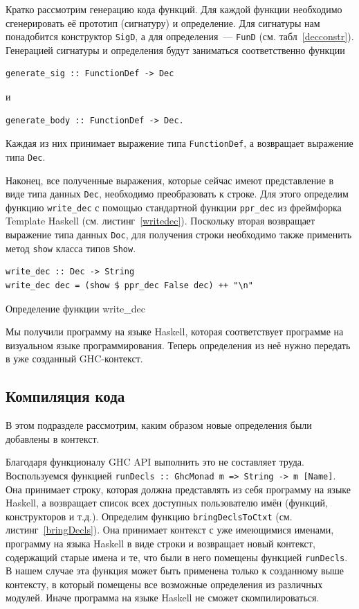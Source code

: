 		Кратко рассмотрим генерацию кода функций. Для каждой функции необходимо сгенерировать её прототип (сигнатуру) и определение. Для сигнатуры нам понадобится конструктор \lstinline!SigD!, а для определения~--- \lstinline!FunD! (см. табл~\ref{decconstr}). Генерацией сигнатуры и определения будут заниматься соответственно функции 
		\begin{lstlisting}
generate_sig :: FunctionDef -> Dec
		\end{lstlisting}
		и
		\begin{lstlisting}
generate_body :: FunctionDef -> Dec.
		\end{lstlisting}		
		Каждая из них принимает выражение типа \lstinline!FunctionDef!, а возвращает выражение типа \lstinline!Dec!.		

		Наконец, все полученные выражения, которые сейчас имеют представление в виде типа данных \lstinline!Dec!, необходимо преобразовать к строке. Для этого определим функцию \lstinline!write_dec! с помощью стандартной функции \lstinline!ppr_dec! из фреймфорка Template Haskell (см. листинг~\ref{writedec}). Поскольку вторая возвращает выражение типа данных \lstinline!Doc!, для получения строки необходимо также применить метод \lstinline!show! класса типов \lstinline!Show!.

\begin{ListingEnv}[h]
	\begin{lstlisting}
write_dec :: Dec -> String
write_dec dec = (show $ ppr_dec False dec) ++ "\n"
	\end{lstlisting}
	\caption{Определение функции write\_dec}\label{writedec}
\end{ListingEnv}		

		Мы получили программу на языке Haskell, которая соответствует программе на визуальном языке программирования. Теперь определения из неё нужно передать в уже созданный GHC-контекст.

	\subsection{Компиляция кода}
		В этом подразделе рассмотрим, каким образом новые определения были добавлены в контекст. 
		
		Благодаря функционалу GHC API выполнить это не составляет труда. Воспользуемся функцией \lstinline!runDecls :: GhcMonad m => String -> m [Name]!. Она принимает строку, которая должна представлять из себя программу на языке Haskell, а возвращает список всех доступных пользователю имён (функций, конструкторов и т.д.). Определим функцию \lstinline!bringDeclsToCtxt! (см. листинг~\ref{bringDecls}). Она принимает контекст с уже имеющимися именами, программу на языка Haskell в виде строки и возвращает новый контекст, содержащий старые имена и те, что были в него помещены функцией \lstinline!runDecls!. В нашем случае эта функция может быть применена только к созданному выше контексту, в который помещены все возможные определения из различных модулей. Иначе программа на языке Haskell не сможет скомпилироваться.


